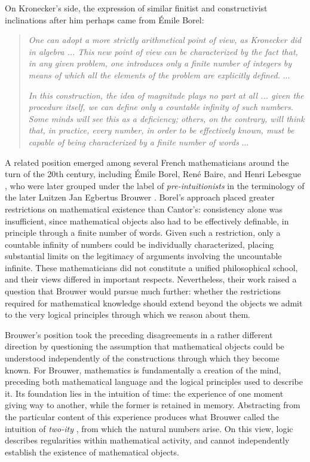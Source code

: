 \documentclass{article}
\begin{document}
On Kronecker's side, the expression of similar finitist and constructivist inclinations after him perhaps came from 
Émile Borel:
\begin{quote}
    \textit{One can adopt a more strictly arithmetical point of view, as Kronecker did in algebra ... This new point of view can be characterized by the fact that, in any given problem, one introduces only a finite number of integers by means of which all the elements of the problem are explicitly defined.} ...

    \textit{In this construction, the idea of magnitude plays no part at all ... given the procedure itself, we can define only a countable infinity of such numbers. Some minds will see this as a deficiency; others, on the contrary, will think that, in practice, every number, in order to be effectively known, must be capable of being characterized by a finite number of words} ... 
\end{quote}
A related position emerged among several French mathematicians around the turn of the 20th century, including Émile 
Borel, René Baire, and Henri Lebesgue \textit{\parencite{hadamard1905}}, who were later grouped under the label of
\textit{pre-intuitionists} in the terminology of the later Luitzen Jan Egbertus Brouwer \textit{\parencite{brouwer1952}}. Borel's approach placed greater 
restrictions on mathematical existence than Cantor's: consistency alone was insufficient, since mathematical objects 
also had to be effectively definable, in principle through a finite number of words. Given such a restriction, only a 
countable infinity of numbers could be individually characterized, placing substantial limits on the legitimacy of 
arguments involving the uncountable infinite. These mathematicians did not constitute a unified philosophical school, 
and their views differed in important respects. Nevertheless, their work raised a question that Brouwer would pursue much 
further: whether the restrictions required for mathematical knowledge should extend beyond the objects we admit to the 
very logical principles through which we reason about them.

Brouwer's position took the preceding disagreements in a rather different direction by questioning the assumption that 
mathematical objects could be understood independently of the constructions through which they become known. For 
Brouwer, mathematics is fundamentally a creation of the mind, preceding both mathematical language and the logical 
principles used to describe it. Its foundation lies in the intuition of time: the experience of one moment giving way to 
another, while the former is retained in memory. Abstracting from the particular content of this experience produces what 
Brouwer called the intuition of \textit{two-ity} \textit{\parencite{brouwer1952}}, from which the natural numbers arise. On this view, logic describes 
regularities within mathematical activity, and cannot independently establish the existence of mathematical objects.
\end{document}
